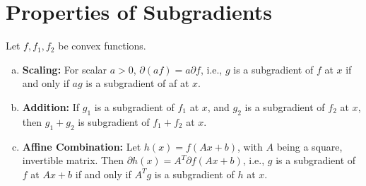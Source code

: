 \documentclass[11pt]{elegantbook}
\begin{document}
\section{Properties of Subgradients}
Let $f,f_1,f_2$ be convex functions.
\begin{enumerate}[(a)]
    \item \textbf{Scaling:} For scalar $a > 0$, $\partial(af) = a\partial f$, i.e., $g$ is a subgradient of $f$ at $x$ if and only if $ag$ is a subgradient of af at $x$.
    \item \textbf{Addition:} If $g_1$ is a subgradient of $f_1$ at $x$, and $g_2$ is a subgradient of $f_2$ at $x$, then $g_1 + g_2$ is subgradient of $f_1 + f_2$ at $x$.
    \item \textbf{Affine Combination:} Let $h(x) = f(Ax+b)$, with $A$ being a square, invertible matrix. Then $\partial h(x) = A^T\partial f(Ax+b)$, i.e., $g$ is a subgradient of $f$ at $Ax + b$ if and only if $A^Tg$ is a subgradient of $h$ at $x$.
\end{enumerate}
\end{document}
